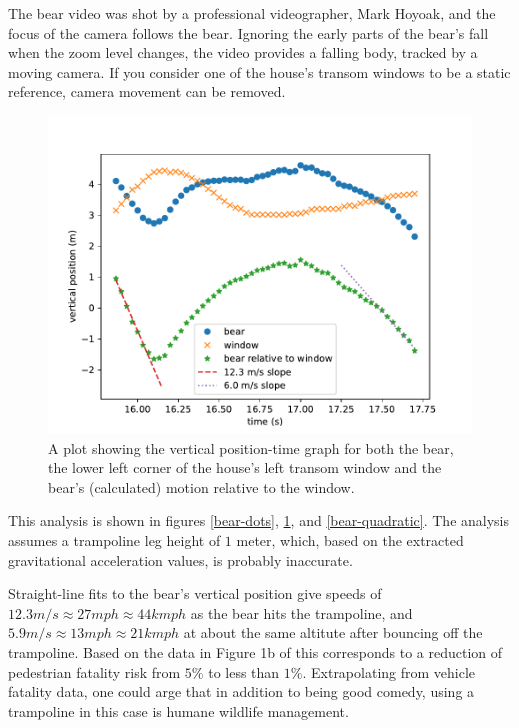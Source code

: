 \documentclass[12pt]{iopart}
\begin{document}
The bear video was shot by a professional videographer, Mark Hoyoak, and the focus of the camera follows the bear.  Ignoring the early parts of the bear's fall when the zoom level changes, the video provides a falling body, tracked by a moving camera.  If you consider one of the house's transom windows to be a static reference, camera movement can be removed.

\begin{figure}[ht]
\centering
\includegraphics[width=\columnwidth]{figure_7_bear-speed.pdf}
\caption{
A plot showing the vertical position-time graph for both the bear, the lower left corner of the house's left transom window and the bear's (calculated)  motion relative to the window. 
}
\label{bear-speed}
\end{figure}

This analysis is shown in figures \ref{bear-dots}, \ref{bear-speed}, and \ref{bear-quadratic}.
The analysis assumes a trampoline leg height of $1$ meter, which, based on the extracted gravitational acceleration values, is probably inaccurate.
 
 Straight-line fits to the bear's vertical position give speeds of $12.3m/s\approx27mph\approx44kmph$ as the bear hits the trampoline, and $5.9m/s\approx13mph\approx21kmph$ at about the same altitute after bouncing off the trampoline.  Based on the data in Figure 1b of \cite{AccidentRisk} this corresponds to a reduction of pedestrian fatality risk from $5\%$ to less than $1\%$.  Extrapolating from vehicle fatality data, one could arge that in addition to being good comedy, using a trampoline in this case is humane wildlife management.     
 
\end{document}
